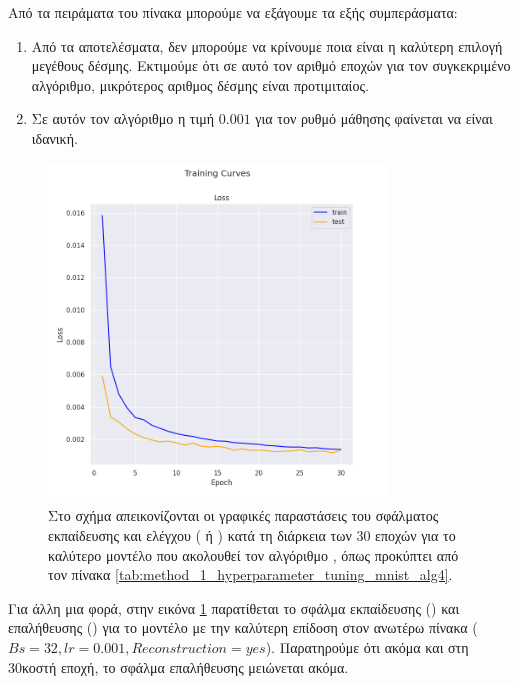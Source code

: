 Από τα πειράματα του πίνακα μπορούμε να εξάγουμε τα εξής συμπεράσματα:
\begin{enumerate}
    \item Από τα αποτελέσματα, δεν μπορούμε να κρίνουμε ποια είναι η καλύτερη επιλογή μεγέθους δέσμης. Εκτιμούμε ότι σε αυτό τον αριθμό εποχών για τον συγκεκριμένο αλγόριθμο, μικρότερος αριθμος δέσμης είναι προτιμιταίος.
    \item Σε αυτόν τον αλγόριθμο η τιμή $0.001$ για τον ρυθμό μάθησης φαίνεται να είναι ιδανική.
\end{enumerate}
\begin{figure}[h]
    \centering
    \includegraphics[width=0.8\textwidth]{images/chapter experiments/method 1/image 3/train_curve.png}
    \caption{Στο σχήμα απεικονίζονται οι γραφικές παραστάσεις του σφάλματος εκπαίδευσης και ελέγχου ( ή ) κατά τη διάρκεια των 30 εποχών για το καλύτερο μοντέλο που ακολουθεί τον αλγόριθμο , όπως προκύπτει από τον πίνακα \ref{tab:method_1_hyperparameter_tuning_mnist_alg4}.}
    \label{fig:exp_method_1_mnist_alg4}
  \end{figure}
Για άλλη μια φορά, στην εικόνα \ref{fig:exp_method_1_mnist_alg4} παρατίθεται το σφάλμα εκπαίδευσης () και επαλήθευσης () για το μοντέλο με την καλύτερη επίδοση στον ανωτέρω πίνακα ($Bs = 32, lr = 0.001, Reconstruction = yes$). Παρατηρούμε ότι ακόμα και στη 30κοστή εποχή, το σφάλμα επαλήθευσης μειώνεται ακόμα.\par


